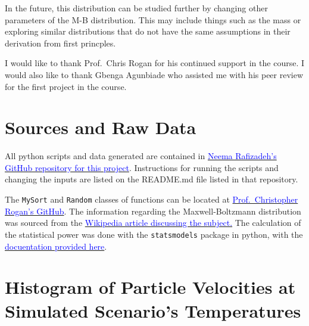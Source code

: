 \documentclass[%
 reprint,
 amsmath,amssymb,
 aps,
]{revtex4-2}
\begin{document}
In the future, this distribution can be studied further by changing other parameters of the M-B distribution. This may include things such as the mass or exploring similar distributions that do not have the same assumptions in their derivation from first princples. 

\acknowledgements

I would like to thank Prof.\ Chris Rogan for his continued support in the course. I would also like to thank Gbenga Agunbiade who assisted me with his peer review for the first project in the course.

\appendix
\section{Sources and Raw Data}

All python scripts and data generated are contained in \href{https://github.com/rafizadehn/PHSX815_Project2}{\textcolor{blue}{Neema Rafizadeh's GitHub repository for this project}}. Instructions for running the scripts and changing the inputs are listed on the README.md file listed in that repository. 

The \lstinline{MySort} and \lstinline{Random} classes of functions can be located at \href{https://github.com/crogan/PHSX815_Week2}{\textcolor{blue}{Prof.\ Christopher Rogan's GitHub}}. The information regarding the Maxwell-Boltzmann distribution was sourced from the \href{https://en.wikipedia.org/wiki/Maxwell%E2%80%93Boltzmann_distribution}{\textcolor{blue}{Wikipedia article discussing the subject.}} The calculation of the statistical power was done with the \lstinline{statsmodels} package in python, with the \href{https://www.statsmodels.org/dev/generated/statsmodels.stats.power.tt_ind_solve_power.html}{\textcolor{blue}{docuentation provided here}}. 

\section{Histogram of Particle Velocities at Simulated Scenario's Temperatures}
\end{document}
